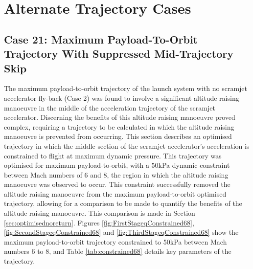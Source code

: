 		\chapter{Alternate Trajectory Cases}
		
		\section{Case 21: Maximum Payload-To-Orbit Trajectory With Suppressed Mid-Trajectory Skip}\label{sec:Appendix_qconst}
		The maximum payload-to-orbit trajectory of the launch system with no scramjet accelerator fly-back (Case 2) was found to involve a significant altitude raising manoeuvre in the middle of the acceleration trajectory of the scramjet accelerator. Discerning the benefits of this altitude raising manoeuvre proved complex, requiring a trajectory to be calculated in which the altitude raising manoeuvre is prevented from occurring. This section describes an optimised trajectory in which the middle section of the scramjet accelerator's acceleration is constrained to flight at maximum dynamic pressure. 
		 This trajectory was optimised for maximum payload-to-orbit, with a 50kPa dynamic constraint between Mach numbers of 6 and 8, the region in which the altitude raising manoeuvre was observed to occur. This constraint successfully removed the altitude raising manoeuvre from the maximum payload-to-orbit optimised trajectory, allowing for a comparison to be made to quantify the benefits of the altitude raising manoeuvre. This comparison is made in Section \ref{sec:optimisednoreturn}. Figures \ref{fig:FirstStageqConstrained68},  \ref{fig:SecondStageqConstrained68} and \ref{fig:ThirdStageqConstrained68} show the maximum payload-to-orbit trajectory constrained to 50kPa between Mach numbers 6 to 8, and Table \ref{tab:constrained68} details key parameters of the trajectory. 
